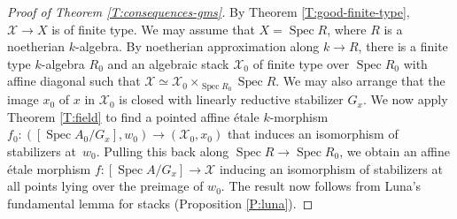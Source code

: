 \documentclass[a4paper]{amsart}
\theoremstyle{plain}
\theoremstyle{definition}
\theoremstyle{remark}
\numberwithin{equation}{section}
\newcommand\cX{\mathcal{X}}
\DeclareMathOperator{\Spec}{Spec}
\begin{document}
\begin{proof}[Proof of Theorem \ref{T:consequences-gms}]
By Theorem \ref{T:good-finite-type}, $\cX \to X$ is of finite type.  We may assume that $X=\Spec R$, where $R$ is a noetherian $k$-algebra. By
  noetherian approximation along $k \to R$, there is a finite type $k$-algebra $R_0$ and an 
  algebraic stack $\cX_0$ of finite type over $\Spec R_0$ with affine diagonal such that $\cX \simeq \cX_0 \times_{\Spec R_0} \Spec R$. We may 
  also arrange that the image $x_0$ of $x$ in $\cX_0$ is closed with linearly reductive 
  stabilizer $G_x$. We now apply Theorem \ref{T:field} to find a pointed affine \'etale 
  $k$-morphism $f_0 \colon ([\Spec A_0/G_x],w_0) \to (\cX_0,x_0)$ that induces an 
  isomorphism of stabilizers at~$w_0$. Pulling this back along $\Spec R \to \Spec R_0$, we 
  obtain an affine \'etale morphism $f \colon [\Spec A/G_x] \to \cX$ inducing an 
  isomorphism of stabilizers at all points lying over the preimage of $w_0$. The result now 
  follows from Luna's fundamental lemma for stacks (Proposition \ref{P:luna}).
\end{proof}
\end{document}
